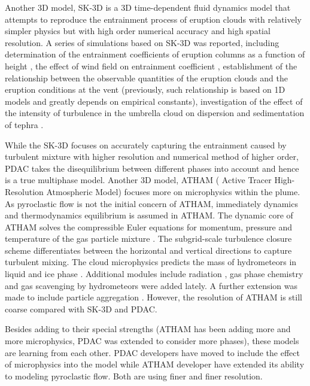 \documentclass[journal abbreviation, manuscript]{copernicus}
\begin{document}
Another 3D model, SK-3D \citep{suzuki2005numerical} is a 3D time-dependent fluid dynamics model that attempts to reproduce the entrainment process of eruption clouds with relatively simpler physics but with high order numerical accuracy and high spatial resolution.
A series of simulations based on SK-3D was reported, including determination of the entrainment coefficients of eruption columns as a function of height \citep{suzuki2010numerical}, the effect of wind field on entrainment coefficient \citep{suzuki20133d}, establishment of the relationship between the observable quantities of the eruption clouds and the eruption conditions at the vent \citep{suzuki2009three} (previously, such relationship is based on 1D models and greatly depends on empirical constants), investigation of the effect of the intensity of turbulence in the umbrella cloud on dispersion and sedimentation of tephra \citep{koyaguchi2009effect}. 

While the SK-3D focuses on accurately capturing the entrainment caused by turbulent mixture with higher resolution and numerical method of higher order, PDAC takes the disequilibrium between different phases into account and hence is a true multiphase model. Another 3D model, ATHAM ( Active Tracer High-Resolution Atmospheric Model) \citep{oberhuber1998volcanic} focuses more on microphysics within the plume. As pyroclastic flow is not the initial concern of ATHAM, immediately dynamics and thermodynamics equilibrium is assumed in ATHAM. The dynamic core of ATHAM solves the compressible Euler equations for momentum, pressure and temperature of the gas particle mixture \citep{oberhuber1998volcanic}. The subgrid-scale turbulence closure scheme differentiates between the horizontal and vertical directions \citep{herzog2003prognostic} to capture turbulent mixing. The cloud microphysics predicts the mass of hydrometeors in liquid and ice phase \citep{herzog1998effect}. Additional modules include radiation \citep{langmann1997radiative}, gas phase chemistry \citep{trentmann2002simulation} and gas scavenging by hydrometeors \citep{textor2003injection} were added lately. A further extension was made to include particle aggregation \citep{textor2006volcanic1, textor2006volcanic2}. However, the resolution of ATHAM is still coarse compared with SK-3D and PDAC.

Besides adding to their special strengths (ATHAM has been adding more and more microphysics, PDAC was extended to consider more phases), these models are learning from each other. PDAC developers have moved to include the effect of microphysics into the model while ATHAM developer have extended its ability to modeling pyroclastic flow. Both are using finer and finer resolution. 
\end{document}
